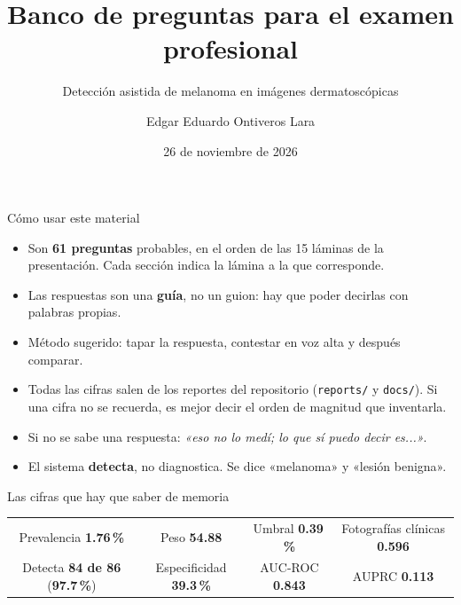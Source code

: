 \documentclass[aspectratio=169,10pt]{beamer}
\title[Banco de preguntas]{Banco de preguntas para el examen profesional}
\subtitle{Detección asistida de melanoma en imágenes dermatoscópicas}
\institute[UACH]{Ingeniería Física\\Facultad de Ingeniería\\Universidad Autónoma de Chihuahua}
\date{26 de noviembre de 2026}
\author[E. E. Ontiveros Lara]{Edgar Eduardo Ontiveros Lara}
\begin{document}
\begin{frame}[plain]
  \titlepage
\end{frame}

\begin{frame}{Cómo usar este material}
  \begin{itemize}
    \item Son \textbf{61 preguntas} probables, en el orden de las 15 láminas de la presentación. Cada sección indica la lámina a la que corresponde.
    \item Las respuestas son una \textbf{guía}, no un guion: hay que poder decirlas con palabras propias.
    \item Método sugerido: tapar la respuesta, contestar en voz alta y después comparar.
    \item Todas las cifras salen de los reportes del repositorio (\texttt{reports/} y \texttt{docs/}). Si una cifra no se recuerda, es mejor decir el orden de magnitud que inventarla.
    \item Si no se sabe una respuesta: \textit{«eso no lo medí; lo que sí puedo decir es...»}.
    \item El sistema \textbf{detecta}, no diagnostica. Se dice «melanoma» y «lesión benigna».
  \end{itemize}
  \vspace{0.4em}
  \begin{exampleblock}{Las cifras que hay que saber de memoria}
    \centering\small
    \begin{tabular}{@{}cccc@{}}
      Prevalencia \textbf{1.76\,\%} & Peso \textbf{54.88} & Umbral \textbf{0.39\,\%} & Fotografías clínicas \textbf{0.596} \\[0.3em]
      Detecta \textbf{84 de 86} (\textbf{97.7\,\%}) & Especificidad \textbf{39.3\,\%} & AUC-ROC \textbf{0.843} & AUPRC \textbf{0.113} \\
    \end{tabular}
  \end{exampleblock}
\end{frame}

\end{document}

